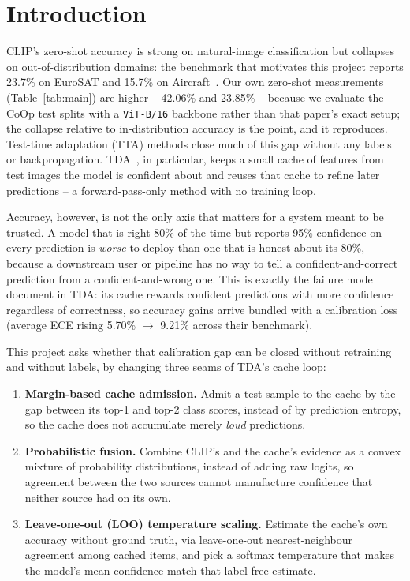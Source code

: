 \section{Introduction}

CLIP's zero-shot accuracy is strong on natural-image classification but collapses on
out-of-di\-stri\-bution domains: the benchmark that motivates this project reports 23.7\% on
EuroSAT and 15.7\% on Aircraft~\cite{sheng2025illusion}. Our own zero-shot measurements
(Table~\ref{tab:main}) are higher -- 42.06\% and 23.85\% -- because we evaluate the CoOp test
splits with a \texttt{ViT-B/16} backbone rather than that paper's exact setup; the collapse
relative to in-distribution accuracy is the point, and it reproduces. Test-time adaptation (TTA) methods
close much of this gap without any labels or backpropagation. TDA~\cite{karmanov2024tda}, in
particular, keeps a small cache of features from test images the model is confident about and
reuses that cache to refine later predictions -- a forward-pass-only method with no training
loop.

Accuracy, however, is not the only axis that matters for a system meant to be trusted. A
model that is right 80\% of the time but reports 95\% confidence on every prediction is
\emph{worse} to deploy than one that is honest about its 80\%, because a downstream user or
pipeline has no way to tell a confident-and-correct prediction from a confident-and-wrong one.
This is exactly the failure mode \citet{sheng2025illusion} document in TDA: its cache rewards
confident predictions with more confidence regardless of correctness, so accuracy gains arrive
bundled with a calibration loss (average ECE rising 5.70\% $\rightarrow$ 9.21\% across their
benchmark).

This project asks whether that calibration gap can be closed without retraining and without
labels, by changing three seams of TDA's cache loop:

\begin{enumerate}
    \item \textbf{Margin-based cache admission.} Admit a test sample to the cache by the gap
        between its top-1 and top-2 class scores, instead of by prediction entropy, so the
        cache does not accumulate merely \emph{loud} predictions.
    \item \textbf{Probabilistic fusion.} Combine CLIP's and the cache's evidence as a convex
        mixture of probability distributions, instead of adding raw logits, so agreement
        between the two sources cannot manufacture confidence that neither source had on its
        own.
    \item \textbf{Leave-one-out (LOO) temperature scaling.} Estimate the cache's own accuracy
        without ground truth, via leave-one-out nearest-neighbour agreement among cached
        items, and pick a softmax temperature that makes the model's mean confidence match
        that label-free estimate.
    \end{enumerate}

